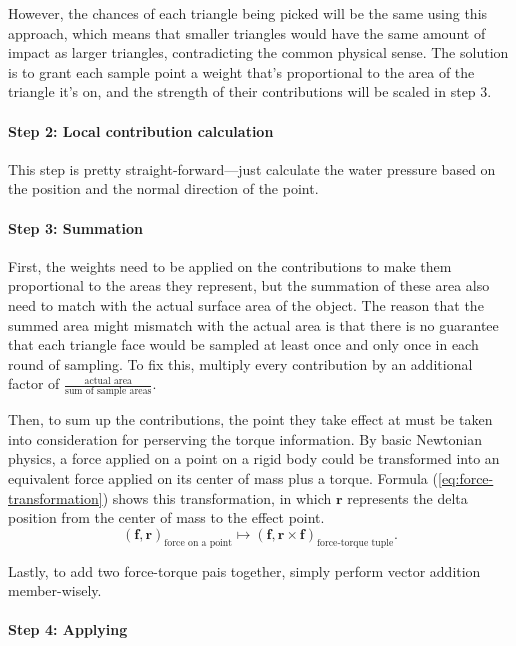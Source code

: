 However, the chances of each triangle being picked will be the same using this approach, which means that smaller triangles would have the same amount of impact as larger triangles, contradicting the common physical sense.
The solution is to grant each sample point a weight that's proportional to the area of the triangle it's on, and the strength of their contributions will be scaled in step 3.

\paragraph*{Step 2: Local contribution calculation}

This step is pretty straight-forward---just calculate the water pressure based on the position and the normal direction of the point.

\paragraph*{Step 3: Summation}

First, the weights need to be applied on the contributions to make them proportional to the areas they represent, but the summation of these area also need to match with the actual surface area of the object.
The reason that the summed area might mismatch with the actual area is that there is no guarantee that each triangle face would be sampled at least once and only once in each round of sampling.
To fix this, multiply every contribution by an additional factor of $\frac{\text{actual area}}{\text{sum of sample areas}}$.

Then, to sum up the contributions, the point they take effect at must be taken into consideration for perserving the torque information.
By basic Newtonian physics, a force applied on a point on a rigid body could be transformed into an equivalent force applied on its center of mass plus a torque.
Formula (\ref{eq:force-transformation}) shows this transformation, in which $\mathbf r$ represents the delta position from the center of mass to the effect point.
\begin{equation}
	(\mathbf f,\mathbf r)_{\text{force on a point}}\mapsto(\mathbf f,\mathbf r\times\mathbf f)_{\text{force-torque tuple}}.
	\label{eq:force-transformation}
\end{equation}

Lastly, to add two force-torque pais together, simply perform vector addition member-wisely.

\paragraph*{Step 4: Applying}

